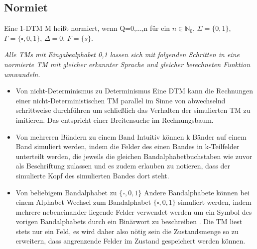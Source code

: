 \documentclass[DIV=15]{scrartcl}
\begin{document}
    \subsection{Normiet}
        Eine 1-DTM M heißt normiert, wenn Q={0,...,n} für ein \(n\in\mathbb{N}_0\), \(\Sigma=\{0,1\}\), \(\Gamma=\{\square,0,1\}\), \(\Delta=0\), \(F=\{s\}\).\par\bigskip
        \textit{
            Alle TMs mit Eingabealphabet {0,1} lassen sich mit folgenden Schritten in eine normierte TM mit gleicher erkannter Sprache und gleicher berechneten Funktion umwandeln.}
        \begin{itemize}
            \item Von nicht-Determinismus zu Determinismus
                \subitem Eine DTM kann die Rechnungen einer nicht-Deterministischen TM parallel im Sinne von abwechselnd schrittweise durchführen 
                um schließlich das Verhalten der simulierten TM zu imitieren.
                Das entspricht einer Breitensuche im Rechnungsbaum.
            \item Von mehreren Bändern zu einem Band
                \subitem Intuitiv können k Bänder auf einem Band simuliert werden, indem die Felder des einen Bandes in k-Teilfelder unterteilt werden, 
                die jeweils die gleichen Bandalphabetbuchstaben wie zuvor als Beschriftung zulassen und es zudem erlauben zu notieren, dass der simulierte Kopf des simulierten Bandes dort steht.  
            \item Von beliebigem Bandalphabet zu \(\{\square,0,1\}\)
            \subitem Andere Bandalphabete können bei einem Alphabet Wechsel zum Bandalphabet \(\{\square,0,1\}\) simuliert werden, 
            indem mehrere nebeneinander liegende Felder verwendet werden um ein Symbol des vorigen Bandalphabets durch ein Binärwort zu beschreiben .
            Die TM liest stets nur ein Feld, es wird daher also nötig sein die Zustandsmenge so zu erweitern, dass angrenzende Felder im Zustand gespeichert werden können.
        \end{itemize}
\end{document}

